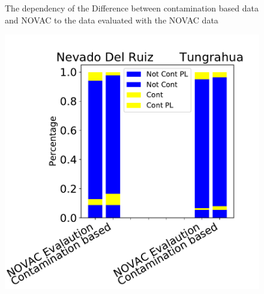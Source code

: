 \documentclass  [
  paper    = a4,
  BCOR     = 10mm,
  twoside,
  fontsize = 12pt,
  fleqn,
  toc      = bibnumbered,
  toc      = listofnumbered,
  numbers  = noendperiod,
  headings = normal,
  listof   = leveldown,
  version  = 3.03
]                                       {scrreprt}
\begin{document}
\begin{figure}[h]
		\caption{The dependency of the Difference between contamination based data and NOVAC to the data evaluated with the NOVAC data }
		\label{fig:diffNovac}
	\end{figure}
\begin{figure}
	\centering
	\includegraphics[width=0.7\linewidth]{Bilder/BarPlot}
	\caption{}
	\label{fig:barplot}
\end{figure}
\end{document}
